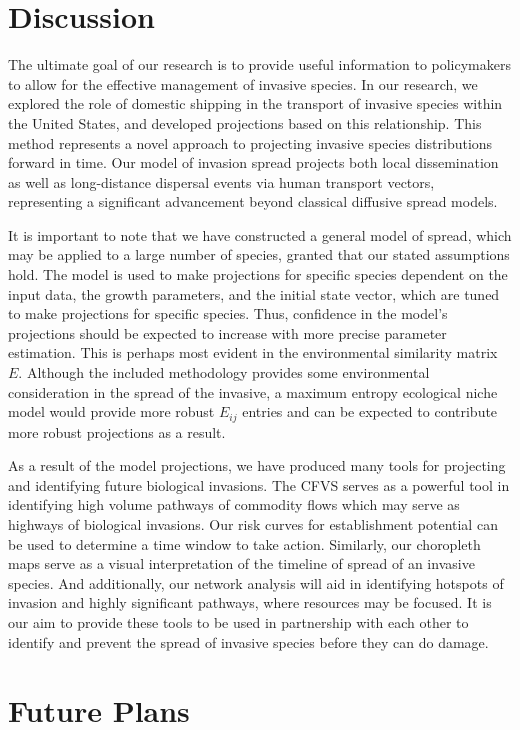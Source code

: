 \documentclass[12pt]{article}
\begin{document}
\section*{Discussion}

The ultimate goal of our research is to provide useful information to policymakers to allow for the effective management of invasive species. In our research, we explored the role of domestic shipping in the transport of invasive species within the United States, and developed projections based on this relationship. This method represents a novel approach to projecting invasive species distributions forward in time. Our model of invasion spread projects both local dissemination as well as long-distance dispersal events via human transport vectors, representing a significant advancement beyond classical diffusive spread models.

It is important to note that we have constructed a general model of spread, which may be applied to a large number of species, granted that our stated assumptions hold. The model is used to make projections for specific species dependent on the input data, the growth parameters, and the initial state vector, which are tuned to make projections for specific species.  Thus, confidence in the model's projections should be expected to increase with more precise parameter estimation.  This is perhaps most evident in the environmental similarity matrix $E$. Although the included methodology provides some environmental consideration in the spread of the invasive, a maximum entropy ecological niche model would provide more robust $E_{ij}$ entries and can be expected to contribute more robust projections as a result.

As a result of the model projections, we have produced many tools for projecting and identifying future biological invasions. The CFVS serves as a powerful tool in identifying high volume pathways of commodity flows which may serve as highways of biological invasions. Our risk curves for establishment potential can be used to determine a time window to take action. Similarly, our choropleth maps serve as a visual interpretation of the timeline of spread of an invasive species. And additionally, our network analysis will aid in identifying hotspots of invasion and highly significant pathways, where resources may be focused. It is our aim to provide these tools to be used in partnership with each other to identify and prevent the spread of invasive species before they can do damage.

\section*{Future Plans}
\end{document}
